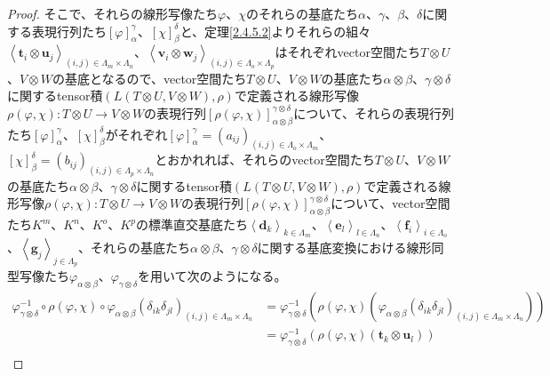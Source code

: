 \documentclass[dvipdfmx]{jsarticle}
\begin{document}
\begin{proof}
そこで、それらの線形写像たち$\varphi$、$\chi$のそれらの基底たち$\alpha$、$\gamma$、$\beta$、$\delta$に関する表現行列たち$[\varphi]^{\gamma}_{\alpha}$、$[\chi]^{\delta}_{\beta}$と、定理\ref{2.4.5.2}よりそれらの組々$\left\langle \mathbf{t}_{i} \otimes \mathbf{u}_{j} \right\rangle_{(i,j) \in \varLambda_{m} \times \varLambda_{n}}$、$\left\langle \mathbf{v}_{i} \otimes \mathbf{w}_{j} \right\rangle_{(i,j) \in \varLambda_{o} \times \varLambda_{p}}$はそれぞれvector空間たち$T \otimes U$、$V \otimes W$の基底となるので、vector空間たち$T \otimes U$、$V \otimes W$の基底たち$\alpha \otimes \beta$、$\gamma \otimes \delta$に関するtensor積$\left( L(T \otimes U,V \otimes W),\rho \right)$で定義される線形写像$\rho(\varphi,\chi):T \otimes U \rightarrow V \otimes W$の表現行列$\left[ \rho(\varphi,\chi) \right]^{\gamma \otimes \delta}_{\alpha \otimes \beta}$について、それらの表現行列たち$[\varphi]^{\gamma}_{\alpha}$、$[\chi]^{\delta}_{\beta}$がそれぞれ$[\varphi]^{\gamma}_{\alpha} = \left( a_{ij} \right)_{(i,j) \in \varLambda_{o} \times \varLambda_{m}}$、$[\chi]^{\delta}_{\beta} = \left( b_{ij} \right)_{(i,j) \in \varLambda_{p} \times \varLambda_{n}}$とおかれれば、それらのvector空間たち$T \otimes U$、$V \otimes W$の基底たち$\alpha \otimes \beta$、$\gamma \otimes \delta$に関するtensor積$\left( L(T \otimes U,V \otimes W),\rho \right)$で定義される線形写像$\rho(\varphi,\chi):T \otimes U \rightarrow V \otimes W$の表現行列$\left[ \rho(\varphi,\chi) \right]^{\gamma \otimes \delta}_{\alpha \otimes \beta}$について、vector空間たち$K^{m}$、$K^{n}$、$K^{o}$、$K^{p}$の標準直交基底たち$\left\langle \mathbf{d}_{k} \right\rangle_{k \in \varLambda_{m}}$、$\left\langle \mathbf{e}_{l} \right\rangle_{l \in \varLambda_{n}}$、$\left\langle \mathbf{f}_{i} \right\rangle_{i \in \varLambda_{o}}$、$\left\langle \mathbf{g}_{j} \right\rangle_{j \in \varLambda_{p}}$、それらの基底たち$\alpha \otimes \beta$、$\gamma \otimes \delta$に関する基底変換における線形同型写像たち$\varphi_{\alpha \otimes \beta}$、$\varphi_{\gamma \otimes \delta}$を用いて次のようになる。
\begin{align*}
\varphi_{\gamma \otimes \delta}^{- 1} \circ \rho(\varphi,\chi) \circ \varphi_{\alpha \otimes \beta}\left( \delta_{ik}\delta_{jl} \right)_{(i,j) \in \varLambda_{m} \times \varLambda_{n}} &= \varphi_{\gamma \otimes \delta}^{- 1}\left( \rho(\varphi,\chi)\left( \varphi_{\alpha \otimes \beta}\left( \delta_{ik}\delta_{jl} \right)_{(i,j) \in \varLambda_{m} \times \varLambda_{n}} \right) \right)\\
&= \varphi_{\gamma \otimes \delta}^{- 1}\left( \rho(\varphi,\chi)\left( \mathbf{t}_{k} \otimes \mathbf{u}_{l} \right) \right)\\

\end{align*}
\end{proof}
\end{document}
